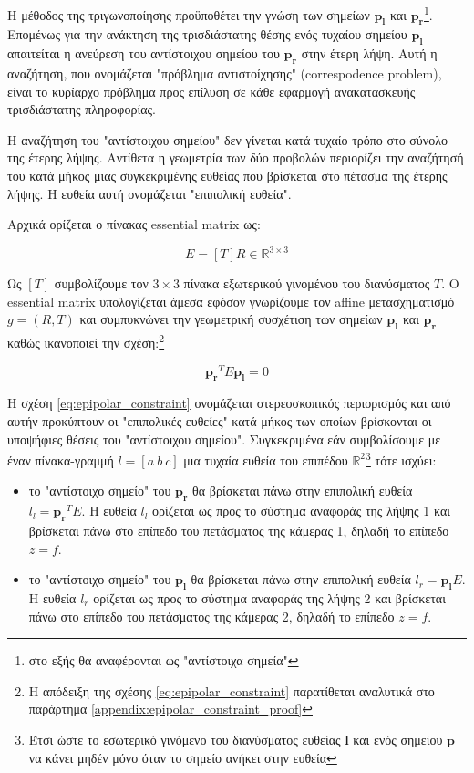 Η μέθοδος της τριγωνοποίησης προϋποθέτει την γνώση των σημείων $\mathbf{p_l}$ και $\mathbf{p_r}$\footnote{στο εξής θα αναφέρονται ως "αντίστοιχα σημεία"}. Επομένως για την ανάκτηση της τρισδιάστατης θέσης ενός τυχαίου σημείου $\mathbf{p_l}$ απαιτείται η ανεύρεση του αντίστοιχου σημείου του $\mathbf{p_r}$ στην έτερη λήψη. Αυτή η αναζήτηση, που ονομάζεται "πρόβλημα αντιστοίχησης" \e (correspodence problem), \g είναι το κυρίαρχο πρόβλημα προς επίλυση σε κάθε εφαρμογή ανακατασκευής τρισδιάστατης πληροφορίας. 

Η αναζήτηση του "αντίστοιχου σημείου" δεν γίνεται κατά τυχαίο τρόπο στο σύνολο της έτερης λήψης. Αντίθετα η γεωμετρία των δύο προβολών περιορίζει την αναζήτησή του κατά μήκος μιας συγκεκριμένης ευθείας που βρίσκεται στο πέτασμα της έτερης λήψης. Η ευθεία αυτή ονομάζεται "επιπολική ευθεία". 

Αρχικά ορίζεται ο πίνακας \e essential matrix \g ως:

$$ E = [T]R \in \mathbb{R}^{3\times3}$$

Ως $[T]$ συμβολίζουμε τον $3\times 3$ πίνακα εξωτερικού γινομένου του διανύσματος $T$. Ο \e essential matrix \g υπολογίζεται άμεσα εφόσον γνωρίζουμε τον \e affine \g μετασχηματισμό $g = (R,T)$ και συμπυκνώνει την γεωμετρική συσχέτιση των σημείων $\mathbf{p_l}$ και $\mathbf{p_r}$ καθώς ικανοποιεί την σχέση:\footnote{Η απόδειξη της σχέσης \ref{eq:epipolar_constraint} παρατίθεται αναλυτικά στο παράρτημα \ref{appendix:epipolar_constraint_proof}}

\begin{equation} \label{eq:epipolar_constraint}
	\mathbf{p_r}^{T} E \mathbf{p_l} = 0
\end{equation}

Η σχέση \ref{eq:epipolar_constraint} ονομάζεται στερεοσκοπικός περιορισμός και από αυτήν προκύπτουν οι "επιπολικές ευθείες" κατά μήκος των οποίων βρίσκονται οι υποψήφιες θέσεις του "αντίστοιχου σημείου". Συγκεκριμένα εάν συμβολίσουμε με έναν πίνακα-γραμμή $l=[a \: b \: c]$ μια τυχαία ευθεία του επιπέδου $\mathbb{R}^2$\footnote{Έτσι ώστε το εσωτερικό γινόμενο του διανύσματος ευθείας $\mathbf{l}$ και ενός σημείου $\mathbf{p}$ να κάνει μηδέν μόνο όταν το σημείο ανήκει στην ευθεία} τότε ισχύει: 

\begin{itemize}

	\item το "αντίστοιχο σημείο" του $\mathbf{p_r}$ θα βρίσκεται πάνω στην επιπολική ευθεία $l_l = \mathbf{p_r}^{T} Ε$. Η ευθεία $l_l$ ορίζεται ως προς το σύστημα αναφοράς της λήψης 1 και βρίσκεται πάνω στο επίπεδο του πετάσματος της κάμερας 1, δηλαδή το επίπεδο $z = f$.
	\item το "αντίστοιχο σημείο" του $\mathbf{p_l}$ θα βρίσκεται πάνω στην επιπολική ευθεία $l_r = \mathbf{p_l} Ε$. Η ευθεία $l_r$ ορίζεται ως προς το σύστημα αναφοράς της λήψης 2 και βρίσκεται πάνω στο επίπεδο του πετάσματος της κάμερας 2, δηλαδή το επίπεδο $z = f$.
\end{itemize}

